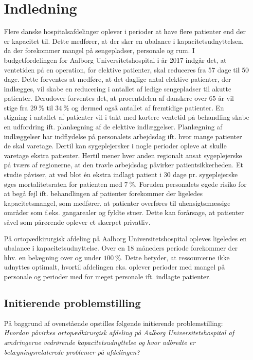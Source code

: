 \chapter{Indledning}
Flere danske hospitalsafdelinger oplever i perioder at have flere patienter end der er kapacitet til. Dette medfører, at der sker en ubalance i kapacitetsudnyttelsen, da der forekommer mangel på sengepladser, personale og rum.\cite{Company2013}  I budgetfordelingen for Aalborg Universitetshospital i år 2017 indgår det, at ventetiden på en operation, for elektive patienter, skal reduceres fra 57 dage til 50 dage\cite{Budget2016}. Dette forventes at medføre, at det daglige antal elektive patienter, der indlægges, vil skabe en reducering i antallet af ledige sengepladser til akutte patienter. Derudover forventes det, at procentdelen af danskere over 65 år vil stige fra $29~\%$ til $34~\%$ og dermed også antallet af fremtidige patienter\cite{RegionNord2016}. En stigning i antallet af patienter vil i takt med kortere ventetid på behandling skabe en udfordring ift. planlægning af de elektive indlæggelser. Planlægning af indlæggelser har indflydelse på personalets arbejdsdag ift. hvor mange patienter de skal varetage. Dertil kan sygeplejersker i nogle perioder opleve at skulle varetage ekstra patienter. Hertil mener hver anden regionalt ansat sygeplejerske på tværs af regionerne, at den travle arbejdsdag påvirker patientsikkerheden\cite{Kjeldsen2015}. Et studie påviser, at ved blot én ekstra indlagt patient i 30 dage pr. sygeplejerske øges mortalitetsraten for patienten med $7~\%$\cite{Aiken2002}. Foruden personalets øgede risiko for at begå fejl ift. behandlingen af patienter forekommer der ligeledes kapacitetsmangel, som medfører, at patienter overføres til uhensigtsmæssige områder som f.eks. gangarealer og fyldte stuer\cite{Madsen2014}. Dette kan forårsage, at patienter såvel som pårørende oplever et skærpet privatliv\cite{Heidmann2014}. 


På ortopædkirurgisk afdeling på Aalborg Universitetshospital opleves ligeledes en ubalance i kapacitetsudnyttelse. Over en 18 måneders periode forekommer der hhv. en belægning over og under $100~\%$\cite{SDS2015}. Dette betyder, at ressourcerne ikke udnyttes optimalt, hvortil afdelingen eks. oplever perioder med mangel på personale og perioder med for meget personale ift. indlagte patienter. 


\section{Initierende problemstilling}
På baggrund af ovenstående opstilles følgende initierende problemstilling: \\
\noindent
\textit{Hvordan påvirkes ortopædkirurgisk afdeling på Aalborg Universitetshospital af ændringerne vedrørende kapacitetsudnyttelse og hvor udbredte er belægningsrelaterede problemer på afdelingen?} 



